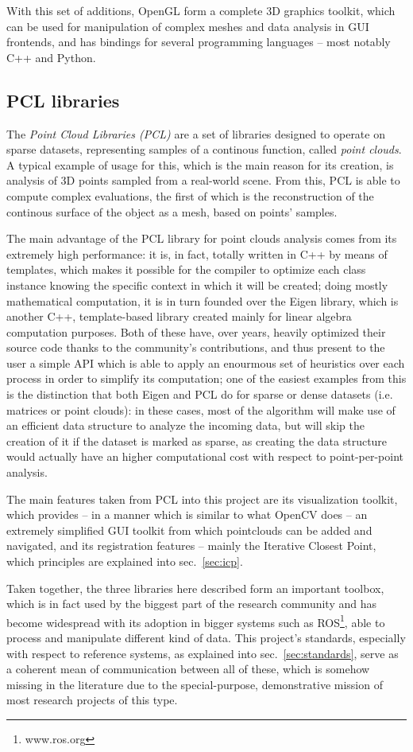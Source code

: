 With this set of additions, OpenGL form a complete 3D graphics
toolkit, which can be used for manipulation of complex meshes and data
analysis in GUI frontends, and has bindings for several programming
languages -- most notably C++ and Python.

\subsection{PCL libraries}
The \emph{Point Cloud Libraries (\emph{PCL})} are a set of libraries
designed to operate on sparse datasets, representing samples of a
continous function, called \emph{point clouds}. A typical example of usage for this, which is the
main reason for its creation, is analysis of 3D points sampled from a
real-world scene. From this, PCL is able to compute complex
evaluations, the first of which is the reconstruction of the continous
surface of the object as a mesh, based on points' samples.

The main advantage of the PCL library for point clouds analysis comes
from its extremely high performance: it is, in fact, totally written
in C++ by means of templates, which makes it possible for the compiler
to optimize each class instance knowing the specific context in which
it will be created; doing mostly mathematical computation, it is in
turn founded over the Eigen library, which is another C++,
template-based library created mainly for linear algebra computation
purposes. Both of these have, over years, heavily optimized their
source code thanks to the community's contributions, and thus present
to the user a simple API which is able to apply an enourmous set of
heuristics over each process in order to simplify its computation; one
of the easiest examples from this is the distinction that both Eigen
and PCL do for sparse or dense datasets (i.e. matrices or point
clouds): in these cases, most of the algorithm will make use of an
efficient data structure to analyze the incoming data, but will skip
the creation of it if the dataset is marked as sparse, as creating the
data structure would actually have an higher computational cost with
respect to point-per-point analysis.

The main features taken from PCL into this project are its
visualization toolkit, which provides -- in a manner which is similar
to what OpenCV does -- an extremely simplified GUI toolkit from which
pointclouds can be added and navigated, and its registration features
-- mainly the Iterative Closest Point, which principles are explained
into sec.~\ref{sec:icp}.

Taken together, the three libraries here described form an important
toolbox, which is in fact used by the biggest part of the research
community and has become widespread with its adoption in bigger
systems such as ROS\footnote{www.ros.org}, able to process and
manipulate different kind of data. This project's standards,
especially with respect to reference systems, as explained
into sec.~\ref{sec:standards}, serve as a coherent mean of
communication between all of these, which is somehow missing in the
literature due to the special-purpose, demonstrative mission of most
research projects of this type.
